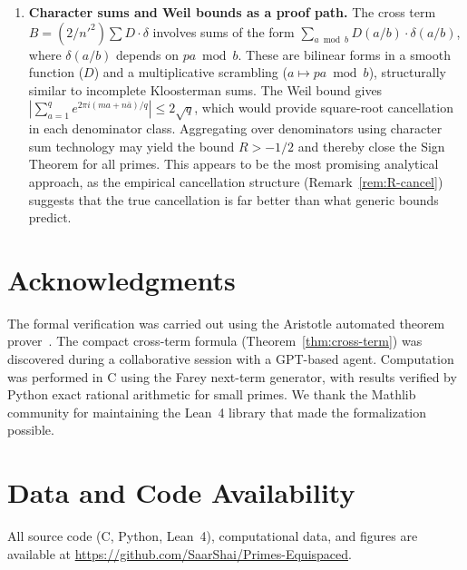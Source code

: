 \documentclass[11pt]{article}
\theoremstyle{definition}
\begin{document}
\begin{enumerate}
  \item \textbf{Character sums and Weil bounds as a proof path.}
    The cross term $B = (2/{n'}^2)\sum D \cdot \delta$ involves
    sums of the form $\sum_{a \bmod b} D(a/b) \cdot \delta(a/b)$,
    where $\delta(a/b)$ depends on $pa \bmod b$.  These are
    bilinear forms in a smooth function ($D$) and a multiplicative
    scrambling ($a \mapsto pa \bmod b$), structurally similar to
    incomplete Kloosterman sums.  The Weil bound gives
    $|\sum_{a=1}^{q} e^{2\pi i(ma + n\bar{a})/q}| \le 2\sqrt{q}$,
    which would provide square-root cancellation in each
    denominator class.  Aggregating over denominators using
    character sum technology may yield the bound $R > -1/2$
    and thereby close the Sign Theorem for all primes.
    This appears to be the most promising analytical approach,
    as the empirical cancellation structure
    (Remark~\ref{rem:R-cancel}) suggests that the true
    cancellation is far better than what generic bounds predict.
\end{enumerate}


\section*{Acknowledgments}

The formal verification was carried out using the Aristotle
automated theorem prover~\cite{Aristotle2025}.  The compact
cross-term formula (Theorem~\ref{thm:cross-term}) was discovered
during a collaborative session with a GPT-based agent.
Computation was performed in C using the Farey next-term
generator, with results verified by Python exact rational
arithmetic for small primes.  We thank the Mathlib community
for maintaining the Lean~4 library that made the formalization
possible.


\section*{Data and Code Availability}

All source code (C, Python, Lean~4), computational data, and
figures are available at
\url{https://github.com/SaarShai/Primes-Equispaced}.

\end{document}
